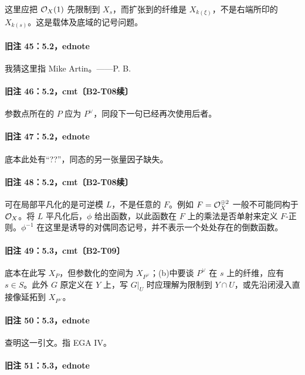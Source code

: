 这里应把 $\mathcal O_X(1)$ 先限制到 $X_s$，而扩张到的纤维是 $X_{k(\xi)}$，不是右端所印的 $X_{k(s)}$。这是载体及底域的记号问题。

\paragraph{旧注 45：5.2，ednote}

我猜这里指 Mike Artin。——P. B.

\paragraph{旧注 46：5.2，cmt〔B2-T08续〕}

参数点所在的 $P$ 应为 $P^\vee$，同段下一句已经再次使用后者。

\paragraph{旧注 47：5.2，ednote}

底本此处有“??”，同态的另一张量因子缺失。

\paragraph{旧注 48：5.2，cmt〔B2-T08续〕}

可在局部平凡化的是可逆模 $L$，不是任意的 $F$。例如 $F=\mathcal O_X^{\oplus2}$ 一般不可能同构于 $\mathcal O_X$。将 $L$ 平凡化后，$\phi$ 给出函数，以此函数在 $F$ 上的乘法是否单射来定义 $F$-正则。$\phi^{-1}$ 在这里是诱导的对偶同态记号，并不表示一个处处存在的倒数函数。

\paragraph{旧注 49：5.3，cmt〔B2-T09〕}

底本在此写 $X_P$，但参数化的空间为 $X_{P^\vee}$；(b)中要谈 $P^\vee$ 在 $s$ 上的纤维，应有 $s\in S$。此外 $G$ 原定义在 $Y$ 上，写 $G|_U$ 时应理解为限制到 $Y\cap U$，或先沿闭浸入直接像延拓到 $X_{P^\vee}$。

\paragraph{旧注 50：5.3，ednote}

查明这一引文。指 EGA IV。

\paragraph{旧注 51：5.3，ednote}

